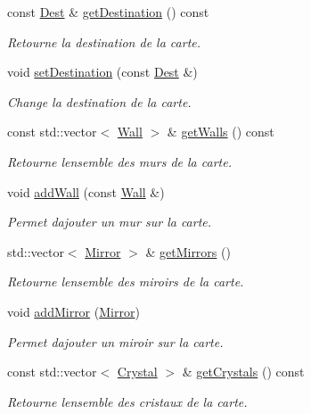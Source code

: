\begin{DoxyCompactItemize}
const \hyperlink{classDest}{Dest} \& \hyperlink{classLevel_aa545dc3931402ed464c7845386c45cbd}{get\+Destination} () const 
\begin{DoxyCompactList}\small\item\em Retourne la destination de la carte. \end{DoxyCompactList}\item 
void \hyperlink{classLevel_a6055c006cb8953d320cfb8974f066755}{set\+Destination} (const \hyperlink{classDest}{Dest} \&)
\begin{DoxyCompactList}\small\item\em Change la destination de la carte. \end{DoxyCompactList}\item 
const std\+::vector$<$ \hyperlink{classWall}{Wall} $>$ \& \hyperlink{classLevel_a5e80b38b27dba47b8f4f2b52accb76bc}{get\+Walls} () const 
\begin{DoxyCompactList}\small\item\em Retourne l\textquotesingle{}ensemble des murs de la carte. \end{DoxyCompactList}\item 
void \hyperlink{classLevel_ab72f4a67155fd0c16894a016a7bb767d}{add\+Wall} (const \hyperlink{classWall}{Wall} \&)
\begin{DoxyCompactList}\small\item\em Permet d\textquotesingle{}ajouter un mur sur la carte. \end{DoxyCompactList}\item 
std\+::vector$<$ \hyperlink{classMirror}{Mirror} $>$ \& \hyperlink{classLevel_a1c834cc0f3d69893d79f60de64d0d79a}{get\+Mirrors} ()
\begin{DoxyCompactList}\small\item\em Retourne l\textquotesingle{}ensemble des miroirs de la carte. \end{DoxyCompactList}\item 
void \hyperlink{classLevel_a9cc738973370d106ac629aacc4acea12}{add\+Mirror} (\hyperlink{classMirror}{Mirror})
\begin{DoxyCompactList}\small\item\em Permet d\textquotesingle{}ajouter un miroir sur la carte. \end{DoxyCompactList}\item 
const std\+::vector$<$ \hyperlink{classCrystal}{Crystal} $>$ \& \hyperlink{classLevel_aa36d324f88e7754b998499bafd5be068}{get\+Crystals} () const 
\begin{DoxyCompactList}\small\item\em Retourne l\textquotesingle{}ensemble des cristaux de la carte. \end{DoxyCompactList}\item 

\end{DoxyCompactItemize}
